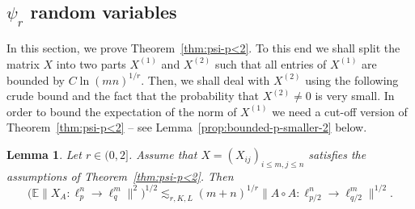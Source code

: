 \documentclass[a4paper]{amsart}
\newtheorem{lemma}[theorem]{Lemma}
\theoremstyle{definition}
\theoremstyle{remark}
\numberwithin{equation}{section}
\newcommand*{\EE}{\mathbb{E}}
\newcommand*{\hadprod}{\mathbin{\circ}} %
\begin{document}
%
\subsection{\texorpdfstring{$\psi_r$}{Psi-r} random variables}
\label{sec:psi-r}
%

In this section, we prove Theorem~\ref{thm:psi-p<2}.
To this end we shall split the matrix $X$ into two parts $X^{(1)}$ and $X^{(2)}$ such that all entries of $X^{(1)}$ are bounded by $C\ln(mn)^{1/r}$. Then, we shall deal with $X^{(2)}$ using the following crude bound and the fact that the probability that $X^{(2)} \neq 0$ is very small. In order to bound the expectation of the norm of $X^{(1)}$ we need a cut-off version of Theorem~\ref{thm:psi-p<2} --  see Lemma~\ref{prop:bounded-p-smaller-2} below.


\begin{lemma}
	\label{lem:cm-prelim-bound-2}
	Let $r\in(0,2]$. Assume that $X = (X_{ij})_{i\leq m, j\leq n}$ satisfies the assumptions of Theorem~\ref{thm:psi-p<2}.
	Then
	\[
	\bigl(\EE \|X_A\colon \ell_{p}^n\to\ell_q^m\|^2\bigr)^{1/2}
	\lesssim_{r,K,L} (m+n)^{1/r}	\|A\hadprod A \colon \ell^n_{p/2} \to \ell^m_{q/2} \|^{1/2}.
	\]
\end{lemma}
\end{document}

